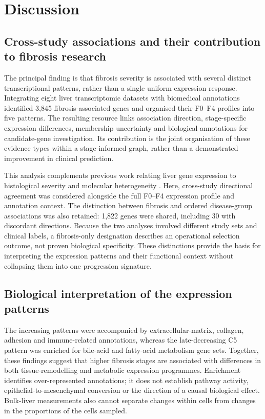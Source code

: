 \documentclass[11pt,a4paper]{article}
\begin{document}
\section*{Discussion}
\subsection*{Cross-study associations and their contribution to fibrosis research}
The principal finding is that fibrosis severity is associated with several distinct transcriptional patterns, rather than a single uniform expression response. Integrating eight liver transcriptomic datasets with biomedical annotations identified 3,845 fibrosis-associated genes and organised their F0--F4 profiles into five patterns. The resulting resource links association direction, stage-specific expression differences, membership uncertainty and biological annotations for candidate-gene investigation. Its contribution is the joint organisation of these evidence types within a stage-informed graph, rather than a demonstrated improvement in clinical prediction.

This analysis complements previous work relating liver gene expression to histological severity and molecular heterogeneity \cite{ref4}. Here, cross-study directional agreement was considered alongside the full F0--F4 expression profile and annotation context. The distinction between fibrosis and ordered disease-group associations was also retained: 1,822 genes were shared, including 30 with discordant directions. Because the two analyses involved different study sets and clinical labels, a fibrosis-only designation describes an operational selection outcome, not proven biological specificity. These distinctions provide the basis for interpreting the expression patterns and their functional context without collapsing them into one progression signature.

\subsection*{Biological interpretation of the expression patterns}
The increasing patterns were accompanied by extracellular-matrix, collagen, adhesion and immune-related annotations, whereas the late-decreasing C5 pattern was enriched for bile-acid and fatty-acid metabolism gene sets. Together, these findings suggest that higher fibrosis stages are associated with differences in both tissue-remodelling and metabolic expression programmes. Enrichment identifies over-represented annotations; it does not establish pathway activity, epithelial-to-mesenchymal conversion or the direction of a causal biological effect. Bulk-liver measurements also cannot separate changes within cells from changes in the proportions of the cells sampled.
\end{document}
